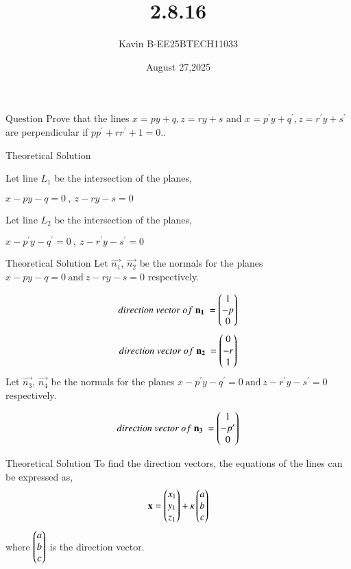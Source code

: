 \documentclass{beamer}
\begin{document}
\title 
{2.8.16}
\date{August 27,2025}


\author 
{Kavin B-EE25BTECH11033}






\frame{\titlepage}
\begin{frame}{Question}
Prove that the lines $x=py+q , z=ry+s \text{ and } x=p^{\prime}y+q^{\prime}, z=r^{\prime}y+s^{\prime} $ are perpendicular if $pp^{\prime}+rr^{\prime}+1=0$..
\end{frame}



\begin{frame}{Theoretical Solution}

Let line $L_1$ be the intersection of the planes,
\begin{center}
    $x-py-q=0\ ,\ z-ry-s=0$
\end{center}
Let line $L_2$ be the intersection of the planes,
\begin{center}
    $x-p^{\prime}y-q^{\prime}=0\ ,\ z-r^{\prime}y-s^{\prime}=0$
\end{center}
\bigskip

\end{frame}

\begin{frame}{Theoretical Solution}
Let $\vec{n_1}$, $\vec{n_2}$ be the normals for the planes $x-py-q=0\ \text{and}\ z-ry-s=0$ respectively.

\begin{align}
    direction\ vector\ of\ \mathbf{n_1}\ = \begin{pmatrix}1\\-p\\0\end{pmatrix}
\end{align}
\begin{align}
    direction\ vector\ of\ \mathbf{n_2}\ = \begin{pmatrix}0\\-r\\1\end{pmatrix}
\end{align}
Let $\vec{n_3}$, $\vec{n_4}$ be the normals for the planes $x-p^{\prime}y-q^{\prime}=0\ \text{and}\ z-r^{\prime}y-s^{\prime}=0$ respectively.

\begin{align}
    direction\ vector\ of\ \mathbf{n_3}\ = \begin{pmatrix}1\\-p^{\prime}\\0\end{pmatrix}
\end{align}
\end{frame}


\begin{frame}{Theoretical Solution}
To find the direction vectors, the equations of the lines can be expressed as,
\begin{align}
	\mathbf{x} = \begin{pmatrix}x_1 \\ y_1 \\ z_1\end{pmatrix} + \kappa \begin{pmatrix}a \\ b \\ c\end{pmatrix}
\end{align}
where $\begin{pmatrix}a\\b\\c\end{pmatrix}$ is the direction vector.\\
\end{frame}
\end{document}
